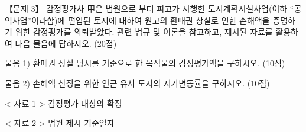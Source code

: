 \begin{longquestion}{【문제 3】}
감정평가사 甲은 법원으로 부터 피고가 시행한 도시계획시설사업(이하 “공익사업”이라함)에 편입된 토지에 대하여 원고의 환매권 상실로 인한 손해액을 증명하기 위한 감정평가를 의뢰받았다. 관련 법규 및 이론을 참고하고, 제시된 자료를 활용하여 다음 물음에 답하시오. (20점) \par
\medskip\noindent 물음 1) 환매권 상실 당시를 기준으로 한 목적물의 감정평가액을 구하시오. (10점) \par
\medskip\noindent 물음 2) 손해액 산정을 위한 인근 유사 토지의 지가변동률을 구하시오. (10점) \par
< 자료 1 > 감정평가 대상의 확정 \par
{\small\centering
{}\par}

< 자료 2 > 법원 제시 기준일자 \par
{\small\centering
{}\par}


\end{longquestion}
